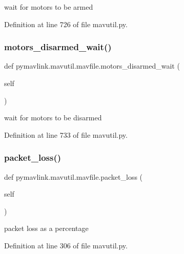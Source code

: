 \begin{DoxyVerb}wait for motors to be armed\end{DoxyVerb}
 

Definition at line 726 of file mavutil.\+py.

\mbox{\label{classpymavlink_1_1mavutil_1_1mavfile_aff2ed2950af9ff7a504b1a304288d019}} 
\subsubsection{\texorpdfstring{motors\_disarmed\_wait()}{motors\_disarmed\_wait()}}
{\footnotesize\ttfamily def pymavlink.\+mavutil.\+mavfile.\+motors\+\_\+disarmed\+\_\+wait (\begin{DoxyParamCaption}\item[{}]{self }\end{DoxyParamCaption})}

\begin{DoxyVerb}wait for motors to be disarmed\end{DoxyVerb}
 

Definition at line 733 of file mavutil.\+py.

\mbox{\label{classpymavlink_1_1mavutil_1_1mavfile_abb4396fef91c8b5768ed865dd441286f}} 
\subsubsection{\texorpdfstring{packet\_loss()}{packet\_loss()}}
{\footnotesize\ttfamily def pymavlink.\+mavutil.\+mavfile.\+packet\+\_\+loss (\begin{DoxyParamCaption}\item[{}]{self }\end{DoxyParamCaption})}

\begin{DoxyVerb}packet loss as a percentage\end{DoxyVerb}
 

Definition at line 306 of file mavutil.\+py.

